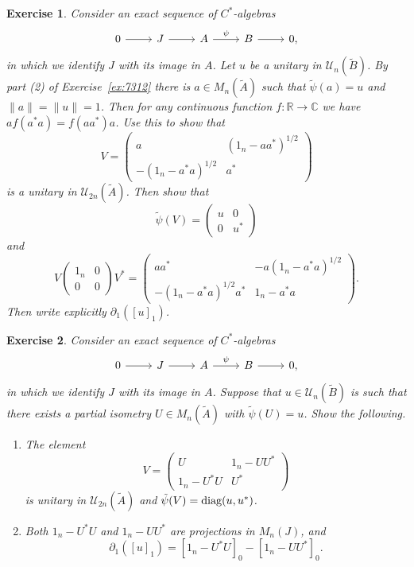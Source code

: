 \documentclass{book}
\newtheorem{exercise}{Exercise}[section]
\def\cstars{\(C^*\)-algebras}
\def\diag{\textnormal{diag}}
\begin{document}
\begin{exercise}\label{ex:7313}
  Consider an exact sequence of \cstars
  \[
    \begin{tikzcd}
      0\arrow[r]&J \arrow[r]&A\arrow[r,"\psi"]&B\arrow[r]&0,
    \end{tikzcd}  
  \]
  in which we identify \(J\) with its image in \(A\). Let \(u\) be a unitary in \(\mathcal{U}_n(\tilde{B})\).
  By part (2) of Exercise~\ref{ex:7312} there is \(a\in M_n(\tilde{A})\) such that \(\tilde{\psi}(a)=u\)
  and \(\|a\|=\|u\|=1\). Then for any continuous function \(f:\mathbb{R}\rightarrow\mathbb{C}\) we have \(af(a^* a)=f(a a^*)a\).
  Use this to show that
  \[
    V=\begin{pmatrix}
    a&{(1_n-a a^*)}^{1/2}\\
    -{(1_n-a^* a)}^{1/2}&a^*  
    \end{pmatrix}
  \]
  is a unitary in \(\mathcal{U}_{2n}(\tilde{A})\). Then show that
  \[
    \tilde{\psi}(V)=\begin{pmatrix}
      u&0\\0&u^*
    \end{pmatrix}
  \]
  and 
  \[
    V\begin{pmatrix}
      1_n&0\\0&0
    \end{pmatrix}V^*=
    \begin{pmatrix}
      a a^*&-a{(1_n-a^* a)}^{1/2}\\
      -{(1_n-a^* a)}^{1/2}a^*&1_n-a^* a
    \end{pmatrix}.
  \]
  Then write explicitly \(\partial_1({[u]}_1)\).
\end{exercise}
\begin{exercise}\label{ex:7314}
  Consider an exact sequence of \cstars\
  \[
    \begin{tikzcd}
      0\arrow[r]&J \arrow[r]&A\arrow[r,"\psi"]&B\arrow[r]&0,
    \end{tikzcd} 
  \]
  in which we identify \(J\) with its image in \(A\). Suppose that \(u\in\mathcal{U}_n(\tilde{B})\) is such that
  there exists a \textit{partial isometry} \(U\in M_n(\tilde{A})\) with \(\tilde{\psi}(U)=u\). Show the following.
  \begin{enumerate}
    \item The element 
    \[
      V=\begin{pmatrix}
        U&1_n-U U^*\\
        1_n-U^* U&U^*
      \end{pmatrix}
    \]
    is unitary in \(\mathcal{U}_{2n}(\tilde{A})\) and \(\tilde{\psi}(V)=\diag(u,u^*)\).
    \item Both \(1_n-U^* U\) and \(1_n-U U^*\) are projections in \(M_n(J)\), and 
    \[\partial_1({[u]}_1)={[1_n-U^* U]}_0-{[1_n-U U^*]}_0.\]
  \end{enumerate}
\end{exercise}
\end{document}
